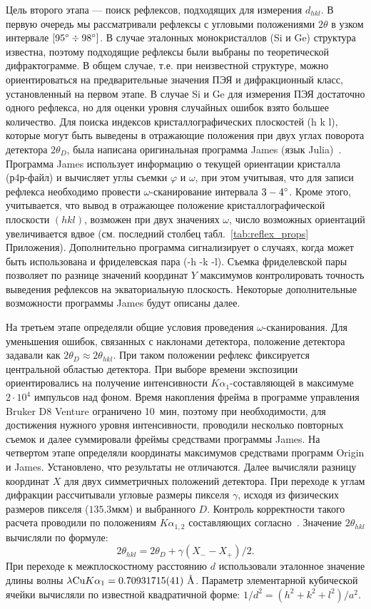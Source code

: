 Цель второго этапа --- поиск рефлексов, подходящих для измерения $d_{hkl}$.
В первую очередь мы рассматривали рефлексы с угловыми положениями $2\theta$ в узком интервале $[95^\circ\div98^\circ]$.
В случае эталонных монокристаллов (Si и Ge) структура известна, поэтому подходящие рефлексы были выбраны по теоретической дифрактограмме.
В общем случае, т.е. при неизвестной структуре, можно ориентироваться на предварительные значения ПЭЯ и дифракционный класс, установленный на первом этапе.
В случае Si и Ge для измерения ПЭЯ достаточно одного рефлекса, но для оценки уровня случайных ошибок взято большее количество.
Для поиска индексов кристаллографических плоскостей \hkl(h k l), которые могут быть выведены в отражающие положения при двух углах поворота детектора $2\theta_D$, была написана оригинальная программа James (язык Julia)~\cite{James}.
Программа James использует информацию о текущей ориентации кристалла (р4р-файл) и вычисляет углы съемки $\varphi$ и $\omega$, при этом учитывая, что для записи рефлекса необходимо провести $\omega$-сканирование интервала $3-4^\circ$.
Кроме этого, учитывается, что вывод в отражающее положение кристаллографической плоскости $(h k l)$, возможен при двух значениях $\omega$, число возможных ориентаций увеличивается вдвое (см. последний столбец табл.~\ref{tab:reflex_props} Приложения).
Дополнительно программа сигнализирует о случаях, когда может быть использована и фриделевская пара \hkl(-h -k -l).
Съемка фриделевской пары позволяет по разнице значений координат $Y$ максимумов контролировать точность выведения рефлексов на экваториальную плоскость.
Некоторые дополнительные возможности программы James будут описаны далее.

На третьем этапе определяли общие условия проведения $\omega$-сканирования.
Для уменьшения ошибок, связанных с наклонами детектора, положение детектора задавали как $2\theta_D \approx 2\theta_{hkl}$.
При таком положении рефлекс фиксируется центральной областью детектора.
При выборе времени экспозиции ориентировались на получение интенсивности $K\alpha_1$-составляющей в максимуме $2 \cdot 10^4$ импульсов над фоном.
Время накопления фрейма в программе управления Bruker D8 Venture ограничено 10~мин, поэтому при необходимости, для достижения нужного уровня интенсивности, проводили несколько повторных съемок и далее суммировали фреймы средствами программы James. 
На четвертом этапе определяли координаты максимумов средствами программ Origin и James. Установлено, что результаты не отличаются.
Далее вычисляли разницу координат $X$ для двух симметричных положений детектора.
При переходе к углам дифракции рассчитывали угловые размеры пикселя $\gamma$, исходя из физических размеров пикселя ($135.3\unit{мкм}$) и выбранного $D$.
Контроль корректности такого расчета проводили по положениям $K\alpha_{1,2}$ составляющих согласно~\cite{Gromilov:2022}. 
Значение $2\theta_{hkl}$ вычисляли по формуле:
\begin{equation}\label{eq:bond2}
    2\theta_{hkl} = 2\theta_D + \gamma (X_- - X_+) / 2.
\end{equation}
При переходе к межплоскостному расстоянию $d$ использовали эталонное значение длины волны $\lambda \text{Cu} K\alpha_1 = 0.70931715(41)\ \text{\AA}$.
Параметр элементарной кубической ячейки вычисляли по известной квадратичной форме: $1/d^2 = (h^2 + k^2 +l^2)/a^2$.
